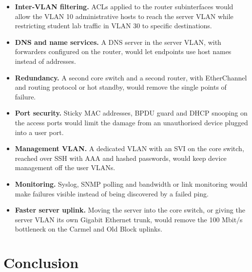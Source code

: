 \documentclass[11pt,a4paper]{article}
\begin{document}
\begin{itemize}
  \item \textbf{Inter-VLAN filtering.} ACLs applied to the router subinterfaces would
        allow the VLAN 10 administrative hosts to reach the server VLAN while
        restricting student lab traffic in VLAN 30 to specific destinations.
  \item \textbf{DNS and name services.} A DNS server in the server VLAN, with forwarders
        configured on the router, would let endpoints use host names instead of
        addresses.
  \item \textbf{Redundancy.} A second core switch and a second router, with
        EtherChannel and routing protocol or hot standby, would remove the single
        points of failure.
  \item \textbf{Port security.} Sticky MAC addresses, BPDU guard and DHCP snooping on
        the access ports would limit the damage from an unauthorised device plugged
        into a user port.
  \item \textbf{Management VLAN.} A dedicated VLAN with an SVI on the core switch,
        reached over SSH with AAA and hashed passwords, would keep device management
        off the user VLANs.
  \item \textbf{Monitoring.} Syslog, SNMP polling and bandwidth or link monitoring
        would make failures visible instead of being discovered by a failed ping.
  \item \textbf{Faster server uplink.} Moving the server into the core switch, or
        giving the server VLAN its own Gigabit Ethernet trunk, would remove the
        100 Mbit/s bottleneck on the Carmel and Old Block uplinks.
\end{itemize}

\section{Conclusion}
\end{document}
